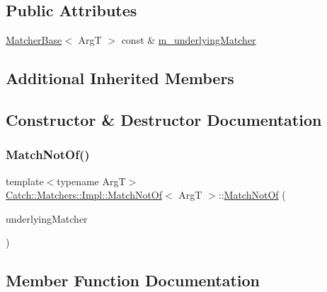 \subsection*{Public Attributes}
\begin{DoxyCompactItemize}
\item 
\mbox{\hyperlink{struct_catch_1_1_matchers_1_1_impl_1_1_matcher_base}{Matcher\+Base}}$<$ ArgT $>$ const  \& \mbox{\hyperlink{struct_catch_1_1_matchers_1_1_impl_1_1_match_not_of_af7ac67f112b0e93796b048a47329aad4}{m\+\_\+underlying\+Matcher}}
\end{DoxyCompactItemize}
\subsection*{Additional Inherited Members}


\subsection{Constructor \& Destructor Documentation}
\mbox{\label{struct_catch_1_1_matchers_1_1_impl_1_1_match_not_of_a47afdd9e4c3354cef85adc3186097ae4}} 
\subsubsection{\texorpdfstring{Match\+Not\+Of()}{MatchNotOf()}}
{\footnotesize\ttfamily template$<$typename ArgT$>$ \\
\mbox{\hyperlink{struct_catch_1_1_matchers_1_1_impl_1_1_match_not_of}{Catch\+::\+Matchers\+::\+Impl\+::\+Match\+Not\+Of}}$<$ ArgT $>$\+::\mbox{\hyperlink{struct_catch_1_1_matchers_1_1_impl_1_1_match_not_of}{Match\+Not\+Of}} (\begin{DoxyParamCaption}\item[{\mbox{\hyperlink{struct_catch_1_1_matchers_1_1_impl_1_1_matcher_base}{Matcher\+Base}}$<$ ArgT $>$ const \&}]{underlying\+Matcher }\end{DoxyParamCaption})\hspace{0.3cm}{\ttfamily [inline]}}



\subsection{Member Function Documentation}
\mbox{\label{struct_catch_1_1_matchers_1_1_impl_1_1_match_not_of_a62bdc7dcb9ff000438a4ed3d5483a248}} 
